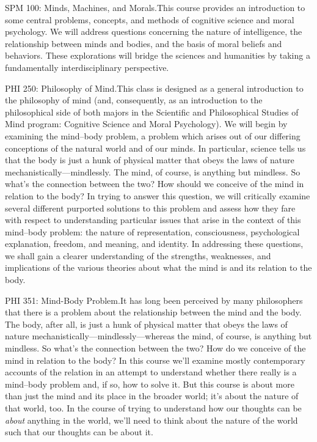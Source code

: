 \documentclass[%
  11pt,%
]{article}
\begin{document}
\begin{htmlcourse}{SPM 100: Minds, Machines, and Morals.}{This course provides an introduction to some central problems, concepts, and methods of cognitive science and moral psychology. We will address questions concerning the nature of intelligence, the relationship between minds and bodies, and the basis of moral beliefs and behaviors. These explorations will bridge the sciences and humanities by taking a fundamentally interdisciplinary perspective.}\end{htmlcourse}

\begin{htmlcourse}{PHI 250: Philosophy of Mind.}{This class is designed as a general introduction to the philosophy of mind (and, consequently, as an introduction to the philosophical side of both majors in the Scientific and Philosophical Studies of Mind program: Cognitive Science and Moral Psychology). We will begin by examining the mind--body problem, a problem which arises out of our differing conceptions of the natural world and of our minds. In particular, science tells us that the body is just a hunk of physical matter that obeys the laws of nature mechanistically---mindlessly. The mind, of course, is anything but mindless. So what's the connection between the two? How should we conceive of the mind in relation to the body? In trying to answer this question, we will critically examine several different purported solutions to this problem and assess how they fare with respect to understanding particular issues that arise in the context of this mind--body problem: the nature of representation, consciousness, psychological explanation, freedom, and meaning, and identity. In addressing these questions, we shall gain a clearer understanding of the strengths, weaknesses, and implications of the various theories about what the mind is and its relation to the body.}\end{htmlcourse}

\begin{htmlcourse}{PHI 351: Mind-Body Problem.}{It has long been perceived by many philosophers that there is a problem about the relationship between the mind and the body. The body, after all, is just a hunk of physical matter that obeys the laws of nature mechanistically---mindlessly---whereas the mind, of course, is anything but mindless. So what's the connection between the two? How do we conceive of the mind in relation to the body? In this course we'll examine mostly contemporary accounts of the relation in an attempt to understand whether there really is a mind--body problem and, if so, how to solve it. But this course is about more than just the mind and its place in the broader world; it's about the nature of that world, too. In the course of trying to understand how our thoughts can be \emph{about} anything in the world, we'll need to think about the nature of the world such that our thoughts can be about it.}\end{htmlcourse}
\end{document}
